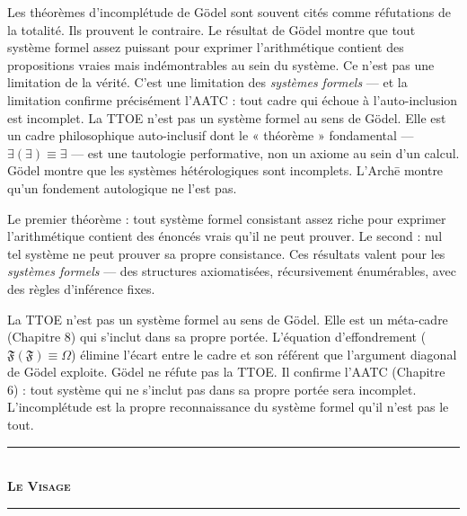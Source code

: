 \documentclass[10pt, openany, oneside]{book}
\renewcommand{\normalsize}{\fontsize{10}{13}\selectfont}
\begin{document}
\vspace{1em}

\noindent Les théorèmes d'incomplétude de Gödel sont souvent cités comme réfutations de la totalité. Ils prouvent le contraire. Le résultat de Gödel montre que tout système formel assez puissant pour exprimer l'arithmétique contient des propositions vraies mais indémontrables au sein du système. Ce n'est pas une limitation de la vérité. C'est une limitation des \textit{systèmes formels} --- et la limitation confirme précisément l'AATC : tout cadre qui échoue à l'auto-inclusion est incomplet. La TTOE n'est pas un système formel au sens de Gödel. Elle est un cadre philosophique auto-inclusif dont le « théorème » fondamental --- $\exists(\exists) \equiv \exists$ --- est une tautologie performative, non un axiome au sein d'un calcul. Gödel montre que les systèmes hétérologiques sont incomplets. L'Arch\={e} montre qu'un fondement autologique ne l'est pas.

Le premier théorème : tout système formel consistant assez riche pour exprimer l'arithmétique contient des énoncés vrais qu'il ne peut prouver. Le second : nul tel système ne peut prouver sa propre consistance. Ces résultats valent pour les \textit{systèmes formels} --- des structures axiomatisées, récursivement énumérables, avec des règles d'inférence fixes.

La TTOE n'est pas un système formel au sens de Gödel. Elle est un méta-cadre (Chapitre 8) qui s'inclut dans sa propre portée. L'équation d'effondrement ($\mathfrak{F}(\mathfrak{F}) \equiv \Omega$) élimine l'écart entre le cadre et son référent que l'argument diagonal de Gödel exploite. Gödel ne réfute pas la TTOE. Il confirme l'AATC (Chapitre 6) : tout système qui ne s'inclut pas dans sa propre portée sera incomplet. L'incomplétude est la propre reconnaissance du système formel qu'il n'est pas le tout.

\vspace{1.5em}


\begin{center}
    \rule{0.3\textwidth}{0.4pt}\\[0.5em]
    {\normalsize\bfseries\scshape Le Visage}\\[0.3em]
    \rule{0.3\textwidth}{0.4pt}
\end{center}

\vspace{1em}
\end{document}
